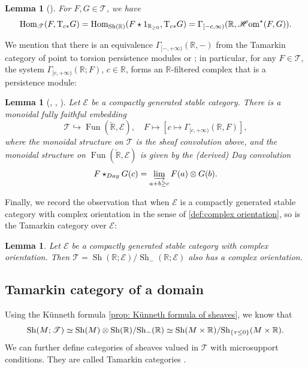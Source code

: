 \documentclass[11pt]{amsart}
\numberwithin{equation}{section}
\theoremstyle{plain}
\newtheorem{Lemma}[lemma]{Lemma}
\theoremstyle{definition}
\theoremstyle{remark}
\newcommand{\bR} { {\mathbb{R}}}
\newcommand{\cE} { {\mathcal{E}}}
\newcommand{\sT} { {\mathscr{T}}}
\newcommand{\Sh} { {\operatorname{Sh}}}
\newcommand\Fun{\operatorname{Fun}}
\newcommand\Hom{\operatorname{Hom}}
\newcommand\sHom{\operatorname{\mathscr{H}om}}
\newcommand\nT{ {\textnormal{T}} }
\newcommand{\larbR} { \overleftarrow{\mathbb{R}}}
\begin{document}
\begin{Lemma}[{\cite[Lemma 4.4]{Hochschild-Kuo-Shende-Zhang}}]\label{lemma: hom computation}For $F,G\in \sT$, we have
\[\Hom_{\sT}(F,\nT_{c*}G)=\Hom_{\Sh(\bR)}(F\star 1_{\bR_{\geq 0}},\nT_{c*}G)=\Gamma_{[-c,\infty)}(\bR,\sHom^{\star}(F,G)).\]
\end{Lemma}

We mention that there is an equivalence $\Gamma_{[-,+\infty)}(\bR, -)$ from the Tamarkin category of point to torsion persistence modules \cite[Lemma 4.9]{Hochschild-Kuo-Shende-Zhang} or \cite[Proposition 4.22]{Efimov-K-theory}; in particular, for any $F \in \sT$, the system $\Gamma_{[c,+\infty)}(\bR; F)$, ${c\in\bR}$, forms an $\bR$-filtered complex that is a persistence module:

\begin{Lemma}[{\cite[Lemma 4.9]{Hochschild-Kuo-Shende-Zhang}, \cite[Proposition 4.22]{Efimov-K-theory}, \cite[Section 4.2]{APT-Tatsuki-Zhang}}]\label{lem:day convolution}
Let $\cE$ be a compactly generated stable category. There is a monoidal fully faithful embedding \[\sT \hookrightarrow \Fun(\larbR, \cE), \quad F \mapsto [c \mapsto \Gamma_{[c,+\infty)}(\bR, F)],\]
where the monoidal structure on $\sT$ is the sheaf convolution above, and the monoidal structure on $\Fun(\larbR, \cE)$ is given by the (derived) Day convolution 
\[F \star_{Day} G(c) = \varinjlim_{a + b \geq c} F(a) \otimes G(b).\]
\end{Lemma}

Finally, we record the observation that when $\cE$ is a compactly generated stable category with complex orientation in the sense of \autoref{def:complex orientation}, so is the Tamarkin category over $\cE$:

\begin{Lemma}\label{lem:complex orientation tamarkin}
Let $\cE$ be a compactly generated stable category with complex orientation. Then $\sT = \Sh(\bR; \cE)/\Sh_-(\bR; \cE)$ also has a complex orientation.
\end{Lemma}

\subsection{Tamarkin category of a domain}\label{sec:tamarkin domain}
Using the K\"unneth formula \autoref{prop: Künneth formula of sheaves}, we know that
\[\Sh(M; \sT) \simeq \Sh(M) \otimes \Sh(\bR)/\Sh_-(\bR)\\
\simeq \Sh(M \times \bR)/\Sh_{\{\tau\leq 0\}}(M \times \bR).\]
We can further define categories of sheaves valued in $\sT$ with microsupport conditions. They are called Tamarkin categories \cite{tamarkin2013,GS2014}.
\end{document}
